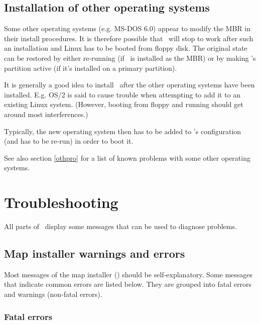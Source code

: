 \subsection{Installation of other operating systems}
\label{instoth}

Some other operating systems (e.g. MS-DOS 6.0) appear to modify the MBR in
their install procedures. It is therefore possible that \LILO\ will stop
to work after such an installation and Linux has to be booted from floppy
disk. The original state can be restored by either re-running
 (if \LILO\ is installed as the MBR) or by making
\LILO's partition active (if it's installed on a primary partition).

It is generally a good idea to install \LILO\ after the other operating
systems have been installed. E.g. OS/2 is said to cause trouble when
attempting to add it to an existing Linux system. (However, booting
from floppy and running  should get around most
interferences.)

Typically, the new operating system then has to be added to \LILO's
configuration (and  has to be re-run) in order to boot
it.

See also section \ref{othpro} for a list of known problems with some
other operating systems.


\newpage
\section{Troubleshooting}

All parts of \LILO\ display some messages that can be used to diagnose
problems. 


\subsection{Map installer warnings and errors}

Most messages of the map installer () should be
self-explanatory. Some messages that indicate common errors are
listed below. They are grouped
into fatal errors and warnings (non-fatal errors).


\subsubsection{Fatal errors}

